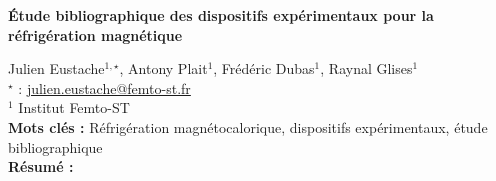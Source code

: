 


    \newpage


%
\begin{flushleft}
\addtocounter{section}{1}
{\Large \textbf{Étude bibliographique des dispositifs expérimentaux pour la réfrigération magnétique}}\label{ref:7}
\end{flushleft}
%
Julien Eustache$^{1,\star}$, Antony Plait$^{1}$, Frédéric Dubas$^{1}$, Raynal Glises$^{1}$\\[2mm]
$^{\star}$ \Letter : \url{julien.eustache@femto-st.fr}\\[2mm]
{\footnotesize $^{1}$ Institut Femto-ST}\\
[4mm]
%
\noindent \textbf{Mots clés : } Réfrigération magnétocalorique, dispositifs expérimentaux, étude bibliographique\\[4mm]
%
\noindent \textbf{Résumé : } 

